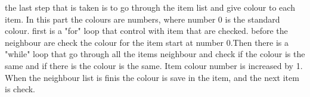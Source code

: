 the last step that is taken is to go through the item list and give colour to each item. In this part the colours are numbers, where number 0 is the standard colour. first is a "for" loop that control with item that are checked. before the neighbour are check the colour for the item start at number 0.Then there is a "while" loop that go through all the items neighbour and check if the colour is the same and if there is the colour is the same. Item colour number is increased by 1. When the neighbour list is finis the colour is save in the item, and the next item is check.